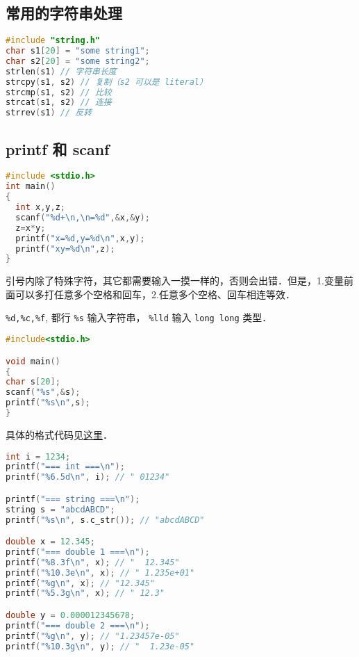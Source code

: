 

\begin{issues}
\issueDraft
\end{issues}

\subsection{常用的字符串处理}
\begin{lstlisting}[language=cpp]
#include "string.h"
char s1[20] = "some string1";
char s2[20] = "some string2";
strlen(s1) // 字符串长度
strcpy(s1, s2) // 复制（s2 可以是 literal）
strcmp(s1, s2) // 比较
strcat(s1, s2) // 连接
strrev(s1) // 反转
\end{lstlisting}

\subsection{printf 和 scanf}
\begin{lstlisting}[language=cpp]
#include <stdio.h>
int main()
{
  int x,y,z;
  scanf("%d+\n,\n=%d",&x,&y);
  z=x*y;
  printf("x=%d,y=%d\n",x,y);
  printf("xy=%d\n",z);
}
\end{lstlisting}
引号内除了特殊字符，其它都需要输入一摸一样的，否则会出错．但是，1.变量前面可以多打任意多个空格和回车，2.任意多个空格、回车相连等效．
 
\verb|%d,%c,%f|, 都行 \verb|%s| 输入字符串， \verb|%lld| 输入 \verb|long long| 类型．

\begin{lstlisting}[language=cpp]
#include<stdio.h>

void main()
{
char s[20];
scanf("%s",&s);
printf("%s\n",s);
}
\end{lstlisting}
具体的格式代码见\href{https://www.tutorialspoint.com/c_standard_library/c_function_printf.htm}{这里}．

\begin{lstlisting}[language=cpp]
int i = 1234;
printf("=== int ===\n");
printf("%6.5d\n", i); // " 01234"

printf("=== string ===\n");
string s = "abcdABCD";
printf("%s\n", s.c_str()); // "abcdABCD"

double x = 12.345;
printf("=== double 1 ===\n");
printf("%8.3f\n", x); // "  12.345"
printf("%10.3e\n", x); // " 1.235e+01"
printf("%g\n", x); // "12.345"
printf("%5.3g\n", x); // " 12.3"

double y = 0.000012345678;
printf("=== double 2 ===\n");
printf("%g\n", y); // "1.23457e-05"
printf("%10.3g\n", y); // "  1.23e-05"
\end{lstlisting}

